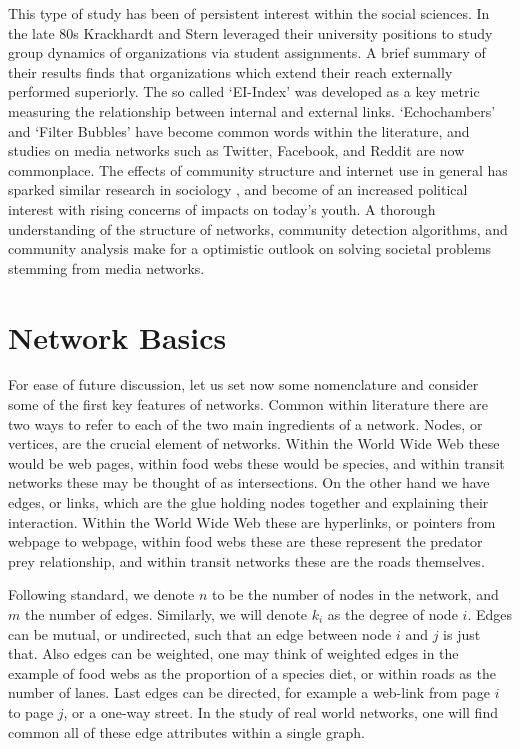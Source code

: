 \documentclass[a4paper, 12pt, twocolumn]{article}
\begin{document}
This type of study has been of persistent interest within the social sciences. 
In the late 80s Krackhardt and Stern \cite{inet_crises} leveraged their university positions to study group dynamics of organizations via student assignments. 
A brief summary of their results finds that organizations which extend their reach externally performed superiorly. 
The so called `EI-Index' was developed as a key metric measuring the relationship between internal and external links. 
`Echochambers' and `Filter Bubbles' have become common words within the literature, and studies on media networks such as Twitter, Facebook, and Reddit \cite{eko_weko, sm_ece, ekoin_ekobtwin} are now commonplace. 
The effects of community structure and internet use in general has sparked similar research in sociology \cite{antisocial, eko_and_episteme, conspiracies_online, captivating}, and become of an increased political interest with rising concerns of impacts on today's youth. 
A thorough understanding of the structure of networks, community detection algorithms, and community analysis make for a optimistic outlook on solving societal problems stemming from media networks.

\section{Network Basics}

For ease of future discussion, let us set now some nomenclature and consider some of the first key features of networks. 
Common within literature there are two ways to refer to each of the two main ingredients of a network. 
Nodes, or vertices, are the crucial element of networks. 
Within the World Wide Web these would be web pages, within food webs these would be species, and within transit networks these may be thought of as intersections. 
On the other hand we have edges, or links, which are the glue holding nodes together and explaining their interaction. 
Within the World Wide Web these are hyperlinks, or pointers from webpage to webpage, within food webs these are these represent the predator prey relationship, and within transit networks these are the roads themselves. 

Following standard, we denote $ n $ to be the number of nodes in the network, and $ m $ the number of edges. 
Similarly, we will denote $ k_i $ as the degree of node $ i $. 
Edges can be mutual, or undirected, such that an edge between node $ i $ and $ j $ is just that. 
Also edges can be weighted, one may think of weighted edges in the example of food webs as the proportion of a species diet, or within roads as the number of lanes. 
Last edges can be directed, for example a web-link from page $ i $ to page $ j $, or a one-way street. 
In the study of real world networks, one will find common all of these edge attributes within a single graph. 
\end{document}

